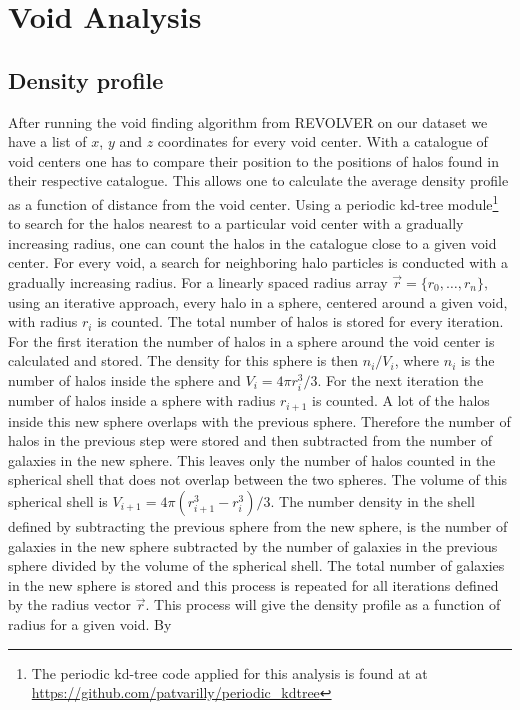 \section{Void Analysis}
\subsection{Density profile}\label{sec:voiddensity}
After running the void finding algorithm from REVOLVER on our dataset we have a list of $x$, $y$
and $z$ coordinates for every void center. With a catalogue of void centers one
has to compare their position to the positions of halos found in their respective catalogue. This allows one to
calculate the average density profile as a function of distance from the void
center. Using a periodic kd-tree module\footnote{The periodic kd-tree code
applied for this analysis is found at at \url{https://github.com/patvarilly/periodic_kdtree}} to search for
the halos nearest to a particular void center with a gradually increasing radius, one can count the halos in
the catalogue close to a given void center. For every void, a search for
neighboring halo particles is conducted with a gradually increasing radius. For
a linearly spaced radius array $\vec{r}=\{r_0,\dots,r_{n}\},$ using an iterative
approach, every halo in a sphere, centered around a given void, with radius $r_{i}$ is counted. The total number of halos is stored for
every iteration. For the first iteration the number of halos in a sphere around the void
center is calculated and stored. The density for this sphere is then $n_i/V_i$,
where $n_i$ is the number of halos inside the sphere and $V_i=4\pi r_{i}^3/3$. For
the next iteration the number of halos inside a sphere with radius $r_{i+1}$ is
counted. A lot of the halos inside this new sphere overlaps with the previous
sphere. Therefore the number of halos in the previous step were stored and then
subtracted from the number of galaxies in the new sphere. This leaves only the number
of halos counted in the spherical shell that does not overlap between the two
spheres. The volume of this spherical shell is $V_{i+1}=4\pi(r_{i+1}^3-r_i^3)/3$. The
number density in the shell defined by subtracting the previous sphere from the
new sphere, is the number of galaxies in the new sphere subtracted by the number
of galaxies in the previous sphere divided by the volume of the spherical shell.
The total number of galaxies in the new sphere is stored and this process is
repeated for all iterations defined by the radius vector $\vec{r}$. This process
will give the density profile as a function of radius for a given void. By
